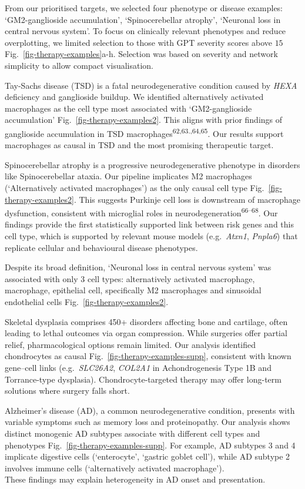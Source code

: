 \documentclass[
]{article}
\begin{document}
From our prioritised targets, we selected four phenotype or disease
examples: `GM2-ganglioside accumulation', `Spinocerebellar atrophy',
`Neuronal loss in central nervous system'. To focus on clinically
relevant phenotypes and reduce overplotting, we limited selection to
those with GPT severity scores above \(15\)
Fig.~\ref{fig-therapy-examples}a-h. Selection was based on severity and
network simplicity to allow compact visualisation.

Tay-Sachs disease (TSD) is a fatal neurodegenerative condition caused by
\emph{HEXA} deficiency and ganglioside buildup. We identified
alternatively activated macrophages as the cell type most associated
with `GM2-ganglioside accumulation' Fig.~\ref{fig-therapy-examples2}.
This aligns with prior findings of ganglioside accumulation in TSD
macrophages\textsuperscript{62,63.,64,65}. Our results support
macrophages as causal in TSD and the most promising therapeutic target.

Spinocerebellar atrophy is a progressive neurodegenerative phenotype in
disorders like Spinocerebellar ataxia. Our pipeline implicates M2
macrophages (`Alternatively activated macrophages') as the only causal
cell type Fig.~\ref{fig-therapy-examples2}. This suggests Purkinje cell
loss is downstream of macrophage dysfunction, consistent with microglial
roles in neurodegeneration\textsuperscript{66--68}. Our findings provide
the first statistically supported link between risk genes and this cell
type, which is supported by relevant mouse models (e.g.~\emph{Atxn1},
\emph{Pnpla6}) that replicate cellular and behavioural disease
phenotypes.

Despite its broad definition, `Neuronal loss in central nervous system'
was associated with only 3 cell types: alternatively activated
macrophage, macrophage, epithelial cell, specifically M2 macrophages and
sinusoidal endothelial cells Fig.~\ref{fig-therapy-examples2}.

Skeletal dysplasia comprises 450+ disorders affecting bone and
cartilage, often leading to lethal outcomes via organ compression. While
surgeries offer partial relief, pharmacological options remain limited.
Our analysis identified chondrocytes as causal
Fig.~\ref{fig-therapy-examples-supp}, consistent with known gene--cell
links (e.g.~\emph{SLC26A2}, \emph{COL2A1} in Achondrogenesis Type 1B and
Torrance-type dysplasia). Chondrocyte-targeted therapy may offer
long-term solutions where surgery falls short.

Alzheimer's disease (AD), a common neurodegenerative condition, presents
with variable symptoms such as memory loss and proteinopathy. Our
analysis shows distinct monogenic AD subtypes associate with different
cell types and phenotypes Fig.~\ref{fig-therapy-examples-supp}. For
example, AD subtypes 3 and 4 implicate digestive cells (`enterocyte',
`gastric goblet cell'), while AD subtype 2 involves immune cells
(`alternatively activated macrophage').\\
These findings may explain heterogeneity in AD onset and presentation.
\end{document}
